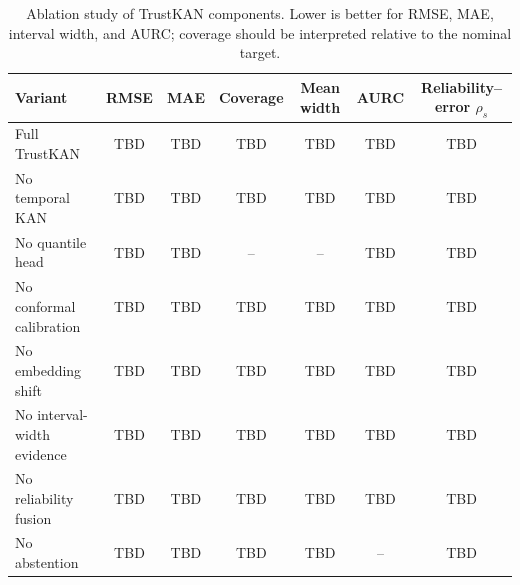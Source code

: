 \begin{table}[t]
\centering
\caption{Ablation study of TrustKAN components. Lower is better for RMSE, MAE, interval width, and AURC; coverage should be interpreted relative to the nominal target.}
\label{tab:ablation}
\begin{tabular}{lcccccc}
\hline
Variant & RMSE & MAE & Coverage & Mean width & AURC & Reliability--error $\rho_s$ \\
\hline
Full TrustKAN & TBD & TBD & TBD & TBD & TBD & TBD \\
No temporal KAN & TBD & TBD & TBD & TBD & TBD & TBD \\
No quantile head & TBD & TBD & -- & -- & TBD & TBD \\
No conformal calibration & TBD & TBD & TBD & TBD & TBD & TBD \\
No embedding shift & TBD & TBD & TBD & TBD & TBD & TBD \\
No interval-width evidence & TBD & TBD & TBD & TBD & TBD & TBD \\
No reliability fusion & TBD & TBD & TBD & TBD & TBD & TBD \\
No abstention & TBD & TBD & TBD & TBD & -- & TBD \\
\hline
\end{tabular}
\end{table}
